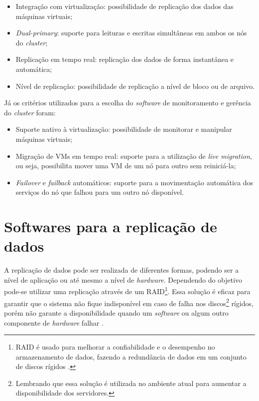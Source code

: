 \begin{itemize}
 \item Integração com virtualização: possibilidade de replicação dos dados das máquinas virtuais;
 \item \textit{Dual-primary}: suporte para leituras e escritas simultâneas em ambos os nós do \textit{cluster};
 \item Replicação em tempo real: replicação dos dados de forma instantânea e automática;
 \item Nível de replicação: possibilidade de replicação a nível de bloco ou de arquivo.
\end{itemize}

Já os critérios utilizados para a escolha do \textit{software} de monitoramento e gerência do \textit{cluster} foram:
\begin{itemize}
 \item Suporte nativo à virtualização: possibilidade de monitorar e manipular máquinas virtuais;
 \item Migração de \acp{VM} em tempo real: suporte para a utilização de \textit{live migration}, ou seja, possibilita mover 
 uma \ac{VM} de um nó para outro sem reiniciá-la;
 \item \textit{Failover} e \textit{failback} automáticos: suporte para a movimentação automática dos serviços do nó que falhou para um outro 
 nó disponível.
\end{itemize}

\section{Softwares para a replicação de dados}
\label{section:toolrepl}

A replicação de dados pode ser realizada de diferentes formas, podendo ser a nível de aplicação ou até mesmo a nível de \textit{hardware}.
Dependendo do objetivo pode-se utilizar uma replicação através de um \ac{RAID}\footnote[1]{RAID é usado para melhorar a confiabilidade e o
desempenho no armazenamento de dados, fazendo a redundância de dados em um conjunto de discos rígidos \cite{zaminhani2008}.}. 
Essa solução é eficaz para garantir que o sistema não fique indisponível em caso de falha nos discos\footnote[2]{Lembrando que essa solução é 
utilizada no ambiente atual para aumentar a disponibilidade dos servidores.} rígidos, porém não garante a disponibilidade quando um 
\textit{software} ou algum outro componente de \textit{hardware} falhar \cite{zaminhani2008}.

